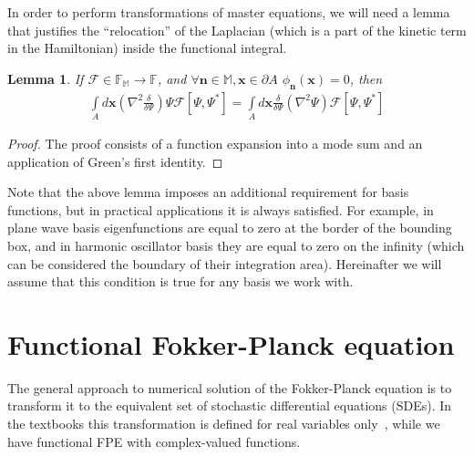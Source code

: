 \documentclass[12pt,aip,jmp,amssymb,amsmath]{revtex4-1}
\newtheorem{lemma}{Lemma}
\begin{document}
In order to perform transformations of master equations, we will need a lemma that justifies the ``relocation'' of the Laplacian (which is a part of the kinetic term in the Hamiltonian) inside the functional integral.

\begin{lemma}
\label{lmm:func-calculus:move-laplacian}
    If $\mathcal{F} \in \mathbb{F}_{\mathbb{M}} \rightarrow \mathbb{F}$, and $\forall \boldsymbol{n} \in \mathbb{M}, \boldsymbol{x} \in \partial A$ $\phi_{\boldsymbol{n}}(\boldsymbol{x}) = 0$, then
    \begin{equation*}\begin{split}
        \int\limits_A d\boldsymbol{x} \left(
            \nabla^2 \frac{\delta}{\delta \Psi}
        \right) \Psi \mathcal{F}[\Psi, \Psi^*]
        = \int\limits_A d\boldsymbol{x} \frac{\delta}{\delta \Psi}
        ( \nabla^2 \Psi ) \mathcal{F}[\Psi, \Psi^*]
    \end{split}\end{equation*}
\end{lemma}
\begin{proof}
The proof consists of a function expansion into a mode sum and an application of Green's first identity.
\end{proof}

Note that the above lemma imposes an additional requirement for basis functions, but in practical applications it is always satisfied.
For example, in plane wave basis eigenfunctions are equal to zero at the border of the bounding box, and in harmonic oscillator basis they are equal to zero on the infinity (which can be considered the boundary of their integration area).
Hereinafter we will assume that this condition is true for any basis we work with.



\section{Functional Fokker-Planck equation}

The general approach to numerical solution of the Fokker-Planck equation is to transform it to the equivalent set of stochastic differential equations (SDEs).
In the textbooks this transformation is defined for real variables only~\cite{Risken1996}, while we have functional FPE with complex-valued functions.
\end{document}
